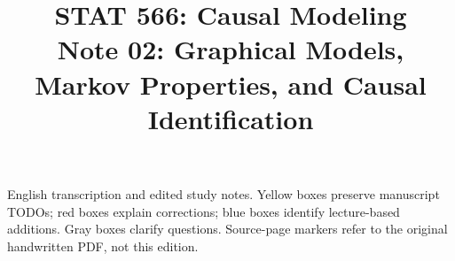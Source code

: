 
\title{STAT 566: Causal Modeling\\[.4em]\large Note 02: Graphical Models, Markov Properties, and Causal Identification}

\maketitle
\begin{remarkbox}
English transcription and edited study notes. Yellow boxes preserve manuscript TODOs; red boxes explain corrections; blue boxes identify lecture-based additions. Gray boxes clarify questions. Source-page markers refer to the original handwritten PDF, not this edition.
\end{remarkbox}
\tableofcontents
\clearpage


